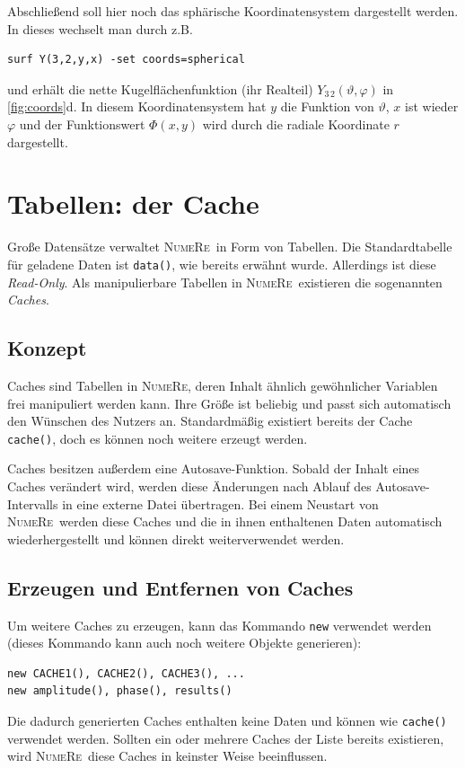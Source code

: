 \documentclass[DIV=14,headsepline,footsepline]{scrbook}
\newcommand{\NR}{\textsc{Nu\-me\-Re}}
\begin{document}
				Abschließend soll hier noch das sphärische Koordinatensystem dargestellt werden. In dieses wechselt man durch z.B.
				\begin{lstlisting}
surf Y(3,2,y,x) -set coords=spherical
				\end{lstlisting}
				und erhält die nette Kugelflächenfunktion (ihr Realteil) $Y_{3\,2}(\vartheta,\varphi)$ in \autoref{fig:coords}d. In diesem Koordinatensystem hat $y$ die Funktion von $\vartheta$, $x$ ist wieder $\varphi$ und der Funktionswert $\Phi(x,y)$ wird durch die radiale Koordinate $r$ dargestellt.
				
		\chapter{Tabellen: der Cache}
			Große Datensätze verwaltet \NR\ in Form von Tabellen. Die Standardtabelle für geladene Daten ist \verb+data()+, wie bereits erwähnt wurde. Allerdings ist diese \emph{Read-Only}. Als manipulierbare Tabellen in \NR\ existieren die sogenannten \emph{Caches}.
			\section{Konzept}
				Caches sind Tabellen in \NR, deren Inhalt ähnlich gewöhnlicher Variablen frei manipuliert werden kann. Ihre Größe ist beliebig und passt sich automatisch den Wünschen des Nutzers an. Standardmäßig existiert bereits der Cache \verb+cache()+, doch es können noch weitere erzeugt werden.
				
				Caches besitzen außerdem eine Autosave-Funktion. Sobald der Inhalt eines Caches verändert wird, werden diese Änderungen nach Ablauf des Autosave-Intervalls in eine externe Datei übertragen. Bei einem Neustart von \NR\ werden diese Caches und die in ihnen enthaltenen Daten automatisch wiederhergestellt und können direkt weiterverwendet werden.
			\section{Erzeugen und Entfernen von Caches}
				Um weitere Caches zu erzeugen, kann das Kommando \verb+new+ verwendet werden (dieses Kommando kann auch noch weitere Objekte generieren):
				\begin{lstlisting}
new CACHE1(), CACHE2(), CACHE3(), ...
new amplitude(), phase(), results()
				\end{lstlisting}
				Die dadurch generierten Caches enthalten keine Daten und können wie \verb+cache()+ verwendet werden. Sollten ein oder mehrere Caches der Liste bereits existieren, wird \NR\ diese Caches in keinster Weise beeinflussen.
				
\end{document}
